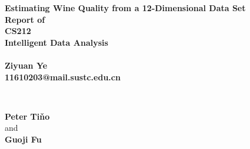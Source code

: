 \documentclass[titlepage,a4paper,12pt,thmsb]{report}
\begin{document}
\begin{titlepage}
\thispagestyle{empty}
\begin{center}
{\LARGE \bf{ Estimating Wine Quality from a 12-Dimensional
Data Set}} \\
\vspace{2.0cm}
\large \bf{ Report of } \\
\large \bf{CS212\\ Intelligent Data Analysis} \\
\vspace{0.3cm}
\large {} \\
\vspace{0.3cm}
\rm
{\large \bf {Ziyuan Ye}}\\
\vspace{0.5cm}
\bf{11610203@mail.sustc.edu.cn} \\

\vspace{1cm}

{\large{}} \\
\vspace{.5cm}

\hspace{.05cm} {\bf {Peter Ti\v{n}o}}\\
\hspace{.05cm} {\sc and}\\
\hspace{.05cm} {\bf {Guoji Fu}}\\
\vspace{0.5cm}
\vspace{0.5cm}

\begin{figure}[h]
{\par}
\end{figure}


\end{center}
\end{titlepage}
\end{document}

